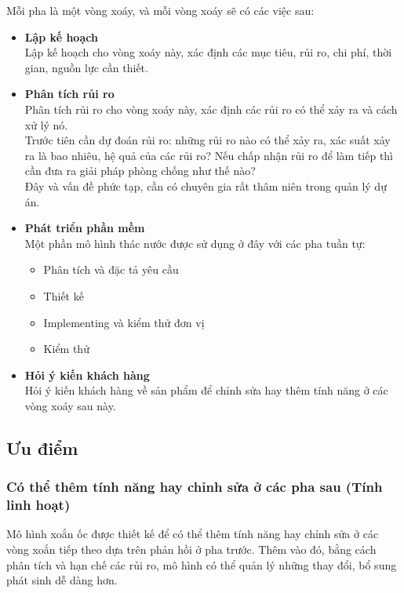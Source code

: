 \documentclass[14pt]{extarticle}
\begin{document}
Mỗi pha là một vòng xoáy, và mỗi vòng xoáy sẽ có các việc sau:
\begin{itemize}
  \item \textbf{Lập kế hoạch}\\
        Lập kế hoạch cho vòng xoáy này, xác định các mục tiêu, rủi ro,
        chi phí, thời gian, nguồn lực cần thiết.
  \item \textbf{Phân tích rủi ro}\\
        Phân tích rủi ro cho vòng xoáy này, xác định các rủi ro có thể
        xảy ra và cách xử lý nó.\\
        Trước tiên cần dự đoán rủi ro: những rủi ro nào có thể
        xảy ra, xác suất xảy ra là bao nhiêu, hệ quả của các rủi ro?
        Nếu chấp nhận rủi ro để làm tiếp thì cần đưa ra giải pháp phòng chống
        như thế nào?\\
        Đây và vấn đề phức tạp, cần có chuyên gia rất thâm niên trong quản lý
        dự án.

  \item \textbf{Phát triển phần mềm}\\
        Một phần mô hình thác nước được sử dụng ở đây với các pha tuần tự:
        \begin{itemize}
          \item Phân tích và đặc tả yêu cầu
          \item Thiết kế
          \item Implementing và kiểm thử đơn vị
          \item Kiểm thử
        \end{itemize}

  \item \textbf{Hỏi ý kiến khách hàng}\\
        Hỏi ý kiến khách hàng về sản phẩm để chỉnh sửa hay thêm
        tính năng ở các vòng xoáy sau này.
\end{itemize}

\subsection{Ưu điểm}
\subsubsection*{Có thể thêm tính năng hay chỉnh sửa ở các pha sau (Tính linh hoạt)}
Mô hình xoắn ốc được thiết kế để có thể thêm tính năng hay chỉnh sửa ở
các vòng xoắn tiếp theo dựa trên phản hồi ở pha trước. Thêm vào đó,
bằng cách phân tích và hạn chế các rủi ro, mô hình có thể quản lý những
thay đổi, bổ sung phát sinh dễ dàng hơn.
\end{document}
